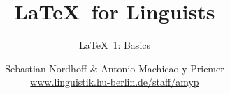 


\title{
	\LaTeX\ for Linguists
}

\subtitle{\LaTeX\ 1: Basics}

\author[aMyP]{
	{\small Sebastian Nordhoff \& Antonio Machicao y Priemer}
	\\
	{\footnotesize \url{www.linguistik.hu-berlin.de/staff/amyp}}
}








\begin{frame}
  \HUtitle
\end{frame}





\nocite{Freitag&MyP15a}
\nocite{Knuth1986}
\nocite{Kopka94a}
\nocite{MyP&Kerkhof16a}
	


%
%
%
%
%


